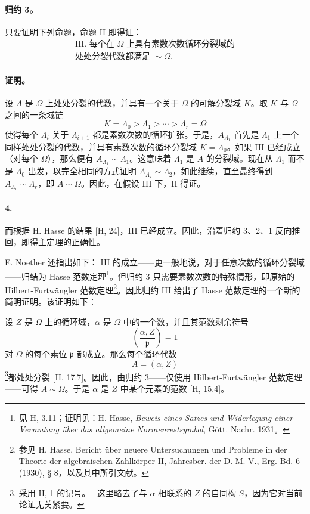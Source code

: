 \documentclass[11pt]{article}
\begin{document}
\paragraph{归约 3。}
只要证明下列命题，命题 II 即得证：
\[
\begin{gathered}\text{III. 每个在 }\Omega\text{ 上具有素数次数循环分裂域的}\\\text{处处分裂代数都满足 }\sim\Omega .\end{gathered}
\]

\paragraph{证明。}
设 \(A\) 是 \(\Omega\) 上处处分裂的代数，并具有一个关于 \(\Omega\) 的可解分裂域 \(K\)。取 \(K\) 与 \(\Omega\) 之间的一条域链
\[
K=\Lambda_0>\Lambda_1>\cdots>\Lambda_r=\Omega
\]
使得每个 \(\Lambda_i\) 关于 \(\Lambda_{i+1}\) 都是素数次数的循环扩张。于是，\(A_{\Lambda_1}\) 首先是 \(\Lambda_1\) 上一个同样处处分裂的代数，并具有素数次数的循环分裂域 \(K=\Lambda_0\)。如果 III 已经成立（对每个 \(\Omega\)），那么便有 \(A_{\Lambda_1}\sim \Lambda_1\)。这意味着 \(\Lambda_1\) 是 \(A\) 的分裂域。现在从 \(\Lambda_1\) 而不是 \(\Lambda_0\) 出发，以完全相同的方式证明 \(A_{\Lambda_2}\sim\Lambda_2\)，如此继续，直至最终得到 \(A_{\Lambda_r}\sim\Lambda_r\)，即 \(A\sim\Omega\)。因此，在假设 III 下，II 得证。

\paragraph{4.}
而根据 H. Hasse 的结果 [H, 24]，III 已经成立。因此，沿着归约 3、2、1 反向推回，即得主定理的正确性。

E. Noether 还指出如下：
III 的成立——更一般地说，对于任意次数的循环分裂域——归结为 Hasse 范数定理\footnote{\label{fn:p38-hasse-normensatz}见 H, 3.11；证明见：H. Hasse, \emph{Beweis eines Satzes und Widerlegung einer Vermutung über das allgemeine Normenrestsymbol}, Gött. Nachr. 1931。}。但归约 3 只需要素数次数的特殊情形，即原始的 Hilbert-Furtwängler 范数定理\footnote{参见 H. Hasse, Bericht über neuere Untersuchungen und Probleme in der Theorie der algebraischen Zahlkörper II, Jahresber. der D. M.-V., Erg.-Bd. 6 (1930), § 8，以及其中所引文献。}。因此归约 III 给出了 Hasse 范数定理的一个新的简明证明。该证明如下：

设 \(Z\) 是 \(\Omega\) 上的循环域，\(\alpha\) 是 \(\Omega\) 中的一个数，并且其范数剩余符号
\[
\left(\frac{\alpha,Z}{\mathfrak p}\right)=1
\]
对 \(\Omega\) 的每个素位 \(\mathfrak p\) 都成立。那么每个循环代数
\[
A=(\alpha,Z)
\]
\footnote{\label{fn:p38-hasse-notation}采用 H, 1 的记号。-- 这里略去了与 \(\alpha\) 相联系的 \(Z\) 的自同构 \(S\)，因为它对当前论证无关紧要。}都处处分裂 [H, 17.7]。因此，由归约 3——仅使用 Hilbert-Furtwängler 范数定理——可得 \(A\sim\Omega\)。于是 \(\alpha\) 是 \(Z\) 中某个元素的范数 [H, 15.4]。
\end{document}
